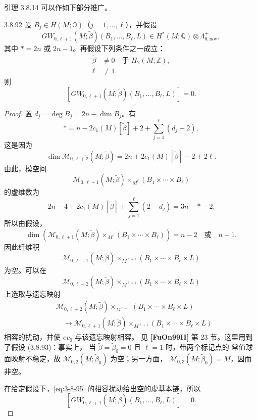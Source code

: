 引理 3.8.14 可以作如下部分推广。

\begin{lemma}{3.8.92}\label{lem:3-8-92}
设 $B_j\in H(M;\mathbb Q)$（$j=1,\ldots,\ell$），并假设
\[
 GW_{0,\ell+1}(M;\widetilde\beta)
 (B_1,\ldots,B_\ell,L)
 \in H^*(M;\mathbb Q)\otimes\Lambda^+_{0,\mathrm{nov}},
\]
其中 $*=2n$ 或 $2n-1$。再假设下列条件之一成立：
\begin{align}
 \widetilde\beta&\ne0
 \quad\text{于 }H_2(M;\mathbb Z),
 \tag{3.8.93.1}\label{eq:3-8-93-1}\\
 \ell&\ne1.
 \tag{3.8.93.2}\label{eq:3-8-93-2}
\end{align}
则
\[
 \left[
 GW_{0,\ell+1}(M;\widetilde\beta)
 (B_1,\ldots,B_\ell,L)
 \right]=0.
\]
\end{lemma}

\begin{proof}
置 $d_j=\deg B_j=2n-\dim B_j$。有
\[
 *=n-2c_1(M)[\widetilde\beta]+2
 +\sum_{j=1}^{\ell}(d_j-2),
\]
这是因为
\[
 \dim\mathcal M_{0,\ell+2}(M;\widetilde\beta)
 =2n+2c_1(M)[\widetilde\beta]-2+2\ell.
\]
由此，模空间
\begin{equation}
 \mathcal M_{0,\ell+1}(M;\widetilde\beta)
 \mathbin{\times_{M^\ell}}
 (B_1\times\cdots\times B_\ell)
\tag{3.8.94}\label{eq:3-8-94}
\end{equation}
的虚维数为
\[
 2n-4+2c_1(M)[\widetilde\beta]
 +\sum_{j=1}^{\ell}(2-d_j)
 =3n-*-2.
\]
所以由假设，
\[
 \dim\left(
 \mathcal M_{0,\ell+1}(M;\widetilde\beta)
 \mathbin{\times_{M^\ell}}
 (B_1\times\cdots\times B_\ell)
 \right)
 =n-2\quad\text{或}\quad n-1.
\]
因此纤维积
\[
 \mathcal M_{0,\ell+1}(M;\widetilde\beta)
 \mathbin{\times_{M^{\ell+1}}}
 (B_1\times\cdots\times B_\ell\times L)
\]
为空。可以在
\begin{equation}
 \mathcal M_{0,\ell+2}(M;\widetilde\beta)
 \mathbin{\times_{M^{\ell+1}}}
 (B_1\times\cdots\times B_\ell\times L)
\tag{3.8.95}\label{eq:3-8-95}
\end{equation}
上选取与遗忘映射
\[
\begin{aligned}
 &\mathcal M_{0,\ell+2}(M;\widetilde\beta)
 \mathbin{\times_{M^{\ell+1}}}
 (B_1\times\cdots\times B_\ell\times L)\\
 &\quad\longrightarrow
 \mathcal M_{0,\ell+1}(M;\widetilde\beta)
 \mathbin{\times_{M^{\ell+1}}}
 (B_1\times\cdots\times B_\ell\times L)
\end{aligned}
\]
相容的扰动，并使 $ev_0$ 与该遗忘映射相容。
见 \textbf{[FuOn99II]} 第 23 节。这里用到了假设 (3.8.93)：事实上，
当 $\widetilde\beta=\widetilde\beta_0=0$ 且 $\ell=1$ 时，带两个标记点的
常值球面映射不稳定，故
$\mathcal M_{0,2}(M;\widetilde\beta_0)$ 为空；另一方面，
$\mathcal M_{0,3}(M;\widetilde\beta_0)=M$，因而非空。

在给定假设下，\eqref{eq:3-8-95} 的相容扰动给出空的虚基本链，所以
\[
 \left[
 GW_{0,\ell+1}(M;\widetilde\beta)
 (B_1,\ldots,B_\ell,L)
 \right]=0.
\]
\end{proof}

